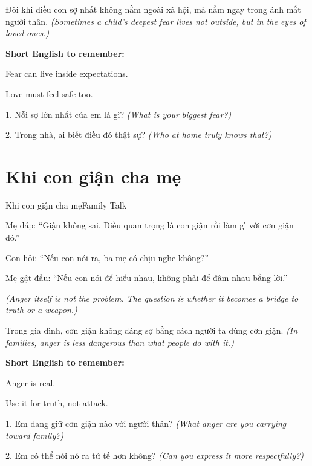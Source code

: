 \begin{baihoc}
Đôi khi điều con sợ nhất không nằm ngoài xã hội, mà nằm ngay trong ánh mắt người thân.
\textit{(Sometimes a child's deepest fear lives not outside, but in the eyes of loved ones.)}
\end{baihoc}

\begin{ghinhoanh}
\textbf{Short English to remember:}

Fear can live inside expectations.

Love must feel safe too.
\end{ghinhoanh}

\begin{tuhocnhanh}
1. Nỗi sợ lớn nhất của em là gì? \textit{(What is your biggest fear?)}

2. Trong nhà, ai biết điều đó thật sự? \textit{(Who at home truly knows that?)}
\end{tuhocnhanh}
\ngancach

\section{Khi con giận cha mẹ}
\begin{truyen}{Khi con giận cha mẹ}{Family Talk}

Mẹ đáp: ``Giận không sai. Điều quan trọng là con giận rồi làm gì với cơn giận đó.''

Con hỏi: ``Nếu con nói ra, ba mẹ có chịu nghe không?''

Mẹ gật đầu: ``Nếu con nói để hiểu nhau, không phải để đâm nhau bằng lời.''

\textit{(Anger itself is not the problem. The question is whether it becomes a bridge to truth or a weapon.)}
\end{truyen}

\begin{baihoc}
Trong gia đình, cơn giận không đáng sợ bằng cách người ta dùng cơn giận.
\textit{(In families, anger is less dangerous than what people do with it.)}
\end{baihoc}

\begin{ghinhoanh}
\textbf{Short English to remember:}

Anger is real.

Use it for truth, not attack.
\end{ghinhoanh}

\begin{tuhocnhanh}
1. Em đang giữ cơn giận nào với người thân? \textit{(What anger are you carrying toward family?)}

2. Em có thể nói nó ra tử tế hơn không? \textit{(Can you express it more respectfully?)}
\end{tuhocnhanh}
\ngancach

